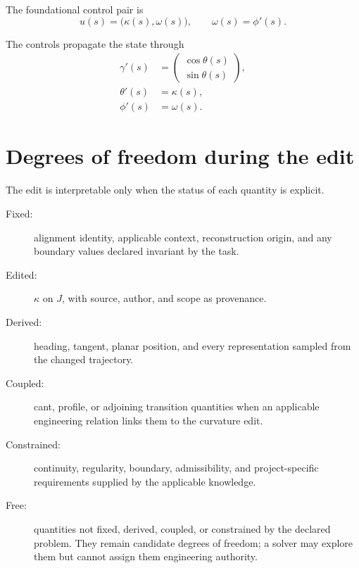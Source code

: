 \begin{definition}
\label{def:control-quantities}
The foundational control pair is
\begin{equation}
u(s)=\bigl(\kappa(s),\omega(s)\bigr),
\qquad \omega(s)=\phi'(s).
\label{eq:pose3-controls}
\end{equation}
\end{definition}

The controls propagate the state through
\begin{equation}
\begin{aligned}
\gamma'(s)&=
\begin{pmatrix}\cos\theta(s)\\\sin\theta(s)\end{pmatrix},\\
\theta'(s)&=\kappa(s),\\
\phi'(s)&=\omega(s).
\end{aligned}
\label{eq:pose3-evolution}
\end{equation}

\section{Degrees of freedom during the edit}

The edit is interpretable only when the status of each quantity is
explicit.

\begin{description}
\item[Fixed:] alignment identity, applicable context, reconstruction
  origin, and any boundary values declared invariant by the task.
\item[Edited:] \(\kappa\) on \(J\), with source, author, and scope as
  provenance.
\item[Derived:] heading, tangent, planar position, and every
  representation sampled from the changed trajectory.
\item[Coupled:] cant, profile, or adjoining transition quantities when an
  applicable engineering relation links them to the curvature edit.
\item[Constrained:] continuity, regularity, boundary, admissibility, and
  project-specific requirements supplied by the applicable knowledge.
\item[Free:] quantities not fixed, derived, coupled, or constrained by
  the declared problem. They remain candidate degrees of freedom; a
  solver may explore them but cannot assign them engineering authority.
\end{description}

